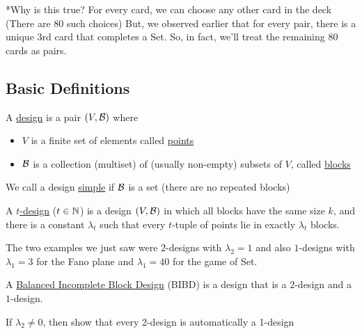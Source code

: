 *Why is this true? For every card, we can choose any other card in the deck (There are 80 such choices)
But, we observed earlier that for every pair, there is a unique 3rd card that completes a Set.
So, in fact, we'll treat the remaining 80 cards as pairs.

\subsection{Basic Definitions}
\begin{definition}
    A \ul{design} is a pair $(V, \mathcal{B})$ where
    \begin{itemize}
        \item $V$ is a finite set of elements called \ul{points}
        \item $\mathcal{B}$ is a collection (multiset) of (usually non-empty) subsets of $V$, called \ul{blocks}
    \end{itemize}
\end{definition}

We call a design \ul{simple} if $\mathcal{B}$ is a set (there are no repeated blocks)

\begin{definition}
    A \ul{$t$-design} ($t \in \mathbb{N}$) is a design $(V, \mathcal{B})$ in which all blocks have the same size $k$, and there is a constant $\lambda_t$ such that every $t$-tuple of points lie in exactly $\lambda_t$ blocks.
\end{definition}

The two examples we just saw were $2$-designs with $\lambda_2 = 1$ and also $1$-designs with $\lambda_1 = 3$ for the Fano plane and $\lambda_1 = 40$ for the game of Set.

\begin{definition}\label{lec1:defn-bibd}
    A \ul{Balanced Incomplete Block Design} (BIBD) is a design that is a $2$-design and a $1$-design.
\end{definition}

\begin{exercise}
    If $\lambda_2 \neq 0$, then show that every 2-design is automatically a 1-design
\end{exercise}